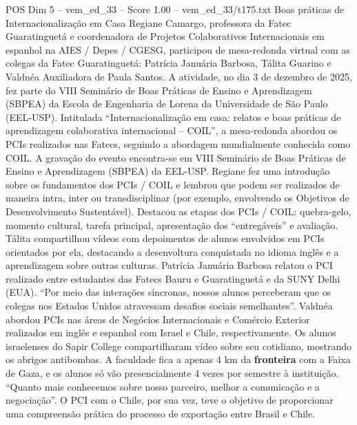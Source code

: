 \begin{textsample}{POS Dim 5 – vem\_ed\_33 – Score 1.00 – vem\_ed\_33/t175.txt}  \label{ex:f5_pos_104}
Boas práticas de Internacionalização em Casa Regiane Camargo, professora da Fatec Guaratinguetá e coordenadora de Projetos Colaborativos Internacionais em espanhol na AIES / Depes / CGESG, participou de mesa-redonda virtual com as colegas da Fatec Guaratinguetá: Patrícia Januária Barbosa, Tálita Guarino e Valdnéa Auxiliadora de Paula Santos.
A atividade, no dia 3 de dezembro de 2025, fez parte do VIII Seminário de Boas Práticas de Ensino e Aprendizagem (SBPEA) da Escola de Engenharia de Lorena da Universidade de São Paulo (EEL-USP).
Intitulada “Internacionalização em casa: relatos e boas práticas de aprendizagem colaborativa internacional – COIL”, a mesa-redonda abordou os PCIs realizados nas Fatecs, seguindo a abordagem mundialmente conhecida como COIL.
A gravação do evento encontra-se em VIII Seminário de Boas Práticas de Ensino e Aprendizagem (SBPEA) da EEL-USP.
Regiane fez uma introdução sobre os fundamentos dos PCIs / COIL e lembrou que podem ser realizados de maneira intra, inter ou transdisciplinar (por exemplo, envolvendo os Objetivos de Desenvolvimento Sustentável).
Destacou as etapas dos PCIs / COIL: quebra-gelo, momento cultural, tarefa principal, apresentação dos “entregáveis” e avaliação.
Tálita compartilhou vídeos com depoimentos de alunos envolvidos em PCIs orientados por ela, destacando a desenvoltura conquistada no idioma inglês e a aprendizagem sobre outras culturas.
Patrícia Januária Barbosa relatou o PCI realizado entre estudantes das Fatecs Bauru e Guaratinguetá e da SUNY Delhi (EUA). “Por meio das interações síncronas, nossos alunos perceberam que os colegas nos Estados Unidos atravessam desafios sociais semelhantes”.
Valdnéa abordou PCIs nas áreas de Negócios Internacionais e Comércio Exterior realizados em inglês e espanhol com Israel e Chile, respectivamente.
Os alunos israelenses do Sapir College compartilharam vídeo sobre seu cotidiano, mostrando os abrigos antibombas.
A faculdade fica a apenas 4 km da \textbf{fronteira} com a Faixa de Gaza, e os alunos só vão presencialmente 4 vezes por semestre à instituição. “Quanto mais conhecemos sobre nosso parceiro, melhor a comunicação e a negociação”.
O PCI com o Chile, por sua vez, teve o objetivo de proporcionar uma compreensão prática do processo de exportação entre Brasil e Chile.

\end{textsample}
